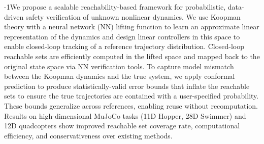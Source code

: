 \label{abstract}
\looseness-1We propose a scalable reachability-based framework for probabilistic, data-driven safety verification of unknown nonlinear dynamics. We use Koopman theory with a neural network (NN) lifting function to learn an approximate linear representation of the dynamics and design linear controllers in this space to enable closed-loop tracking of a reference trajectory distribution. Closed-loop reachable sets are efficiently computed in the lifted space and mapped back to the original state space via NN verification tools. To capture model mismatch between the Koopman dynamics and the true system, we apply conformal prediction to produce statistically-valid error bounds that inflate the reachable sets to ensure the true trajectories are contained with a user-specified probability. These bounds generalize across references, enabling reuse without recomputation. Results on high-dimensional MuJoCo tasks (11D Hopper, 28D Swimmer) and 12D quadcopters show improved reachable set coverage rate, computational efficiency, and conservativeness over existing methods.